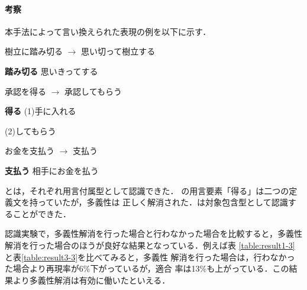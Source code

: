 \documentclass{nlp}
\begin{document}
\paragraph{考察}
本手法によって言い換えられた表現の例を以下に示す．
\begin{example}
 \item 樹立に踏み切る $\rightarrow$ 思い切って樹立する 

 {\bf 踏み切る} \hspace{10pt}思いきってする

 \item 承認を得る $\rightarrow$ 承認してもらう 
 
 {\bf 得る} \hspace{10pt}(1)\hspace{5pt}手に入れる
 
 \hspace{10pt}\hspace{0.7
cm} (2)\hspace{5pt}してもらう
 
 \item お金を支払う $\rightarrow$ 支払う 

 {\bf 支払う} \hspace{10pt}相手にお金を払う
\end{example}
とは，それぞれ用言付属型として認識できた．
の用言要素「得る」は二つの定義文を持っていたが，多義性は
正しく解消された．は対象包含型として認識することができた．

認識実験で，多義性解消を行った場合と行わなかった場合を比較すると，多義性
解消を行った場合のほうが良好な結果となっている．例えば表
\ref{table:result1-3}と表\ref{table:result3-3}を比べてみると，多義性
解消を行った場合は，行わなかった場合より再現率が6\%下がっているが，適合
率は13\%も上がっている．この結果より多義性解消は有効に働いたといえる．
\end{document}
